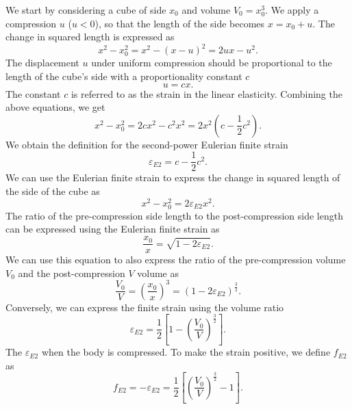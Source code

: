 We start by considering a cube of side $x_0$ and volume $V_0 = x_0^3$. We
apply a compression $u$ ($u < 0$), so that the length of the side becomes
$x = x_0 + u$. The change in squared length is expressed as
\begin{equation}
  x^2 - x_0^2 = x^2 - (x - u)^2 = 2ux - u^2.
\end{equation}
The displacement $u$ under uniform compression should be proportional to the
length of the cube's side with a proportionality constant $c$
\begin{equation}
  u = cx.
\end{equation}
The constant $c$ is referred to as the strain in the linear elasticity.
Combining the above equations, we get
\begin{equation}
  x^2 - x_0^2 = 2cx^2 - c^2x^2 = 2x^2(c - \frac{1}{2}c^2).
\end{equation}
We obtain the definition for the second-power Eulerian finite strain
\begin{equation}
  \varepsilon_{E2} = c - \frac{1}{2}c^2.
\end{equation}
We can use the Eulerian finite strain to express the change in squared length
of the side of the cube as
\begin{equation}
  x^2 - x_0^2 = 2\varepsilon_{E2}x^2.
\end{equation}
The ratio of the pre-compression side length to the post-compression side
length can be expressed using the Eulerian finite strain as
\begin{equation}
  \frac{x_0}{x} = \sqrt{1 - 2\varepsilon_{E2}}.
\end{equation}
We can use this equation to also express the ratio of the pre-compression
volume $V_0$ and the post-compression $V$ volume as
\begin{equation}
  \frac{V_0}{V} = \left(\frac{x_0}{x}\right)^3 =
  \left(1 - 2 \varepsilon_{E2}\right)^{\frac{3}{2}}.
\end{equation}
Conversely, we can express the finite strain using the volume ratio
\begin{equation}
  \varepsilon_{E2} = \frac{1}{2} \left[
    1 - \left(\frac{V_0}{V}\right)^{\frac{3}{2}}
  \right].
\end{equation}
The $\varepsilon_{E2}$ when the body is compressed. To make the strain
positive, we define $f_{E2}$ as
\begin{equation}
  f_{E2} = -\varepsilon_{E2} = \frac{1}{2} \left[
    \left(\frac{V_0}{V}\right)^{\frac{3}{2}} - 1
  \right].
  \label{eq:finite-strain}
\end{equation}

